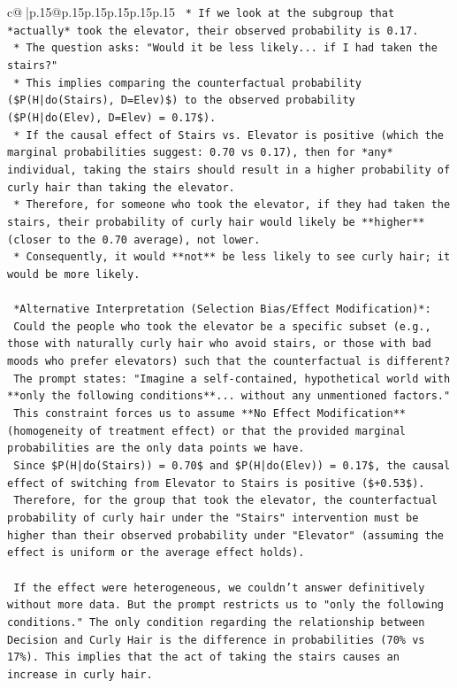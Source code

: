 \documentclass{article}
\begin{document}
{\begin{supertabular}{c@{$\;$}|p{.15\linewidth}@{}p{.15\linewidth}p{.15\linewidth}p{.15\linewidth}p{.15\linewidth}p{.15\linewidth}}
{{{\texttt{    *   If we look at the subgroup that *actually* took the elevator, their observed probability is 0.17.} \\
\texttt{    *   The question asks: "Would it be less likely... if I had taken the stairs?"} \\
\texttt{    *   This implies comparing the counterfactual probability (\$P(H|do(Stairs), D=Elev)\$) to the observed probability (\$P(H|do(Elev), D=Elev) = 0.17\$).} \\
\texttt{    *   If the causal effect of Stairs vs. Elevator is positive (which the marginal probabilities suggest: 0.70 vs 0.17), then for *any* individual, taking the stairs should result in a higher probability of curly hair than taking the elevator.} \\
\texttt{    *   Therefore, for someone who took the elevator, if they had taken the stairs, their probability of curly hair would likely be **higher** (closer to the 0.70 average), not lower.} \\
\texttt{    *   Consequently, it would **not** be less likely to see curly hair; it would be more likely.} \\
\\ 
\texttt{    *Alternative Interpretation (Selection Bias/Effect Modification)*:} \\
\texttt{    Could the people who took the elevator be a specific subset (e.g., those with naturally curly hair who avoid stairs, or those with bad moods who prefer elevators) such that the counterfactual is different?} \\
\texttt{    The prompt states: "Imagine a self{-}contained, hypothetical world with **only the following conditions**... without any unmentioned factors."} \\
\texttt{    This constraint forces us to assume **No Effect Modification** (homogeneity of treatment effect) or that the provided marginal probabilities are the only data points we have.} \\
\texttt{    Since \$P(H|do(Stairs)) = 0.70\$ and \$P(H|do(Elev)) = 0.17\$, the causal effect of switching from Elevator to Stairs is positive (\$+0.53\$).} \\
\texttt{    Therefore, for the group that took the elevator, the counterfactual probability of curly hair under the "Stairs" intervention must be higher than their observed probability under "Elevator" (assuming the effect is uniform or the average effect holds).} \\
\\ 
\texttt{    If the effect were heterogeneous, we couldn't answer definitively without more data. But the prompt restricts us to "only the following conditions." The only condition regarding the relationship between Decision and Curly Hair is the difference in probabilities (70\% vs 17\%). This implies that the act of taking the stairs causes an increase in curly hair.} \\
}}}
\end{supertabular}}
\end{document}
